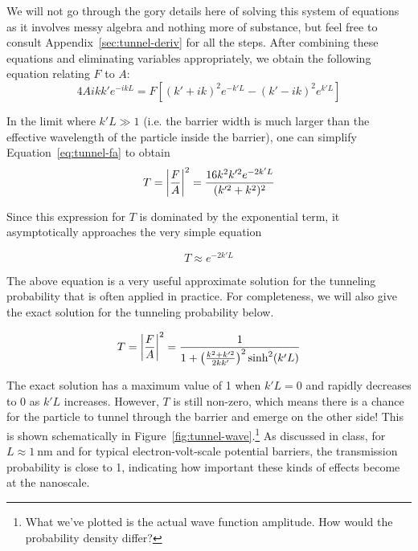We will not go through the gory details here of solving this system of equations as it involves messy algebra and nothing more of substance, but feel free to consult Appendix~\ref{sec:tunnel-deriv} for all the steps. After combining these equations and eliminating variables appropriately, we obtain the following equation relating $F$ to $A$:
\begin{equation}
	4Aikk'e^{-ikL} = F \left[(k'+ik)^2e^{-k'L} - (k'-ik)^2e^{k'L}\right] \label{eq:tunnel-fa}
\end{equation}

In the limit where $k'L \gg 1$ (i.e. the barrier width is much larger than the effective wavelength of the particle inside the barrier), one can simplify Equation~\ref{eq:tunnel-fa} to obtain
\begin{equation}
	T = \abs{\frac{F}{A}}^2 = \frac{16k^2k^{\prime 2}e^{-2k'L}}{(k^{\prime 2}+k^2)^2} \label{eq:tunnel-prob}
\end{equation}

Since this expression for $T$ is dominated by the exponential term, it asymptotically approaches the very simple equation
\begin{tcolorbox}[title = Tunneling probability approximation when $E < V_0$] \vspace{-2ex}
	\begin{equation}
		T \approx e^{-2k'L} \label{eq:tunnel-approx}
	\end{equation}
\end{tcolorbox}

The above equation is a very useful approximate solution for the tunneling probability that is often applied in practice. For completeness, we will also give the exact solution for the tunneling probability below.
\begin{tcolorbox}[title = Tunneling probability exact solution when $E < V_0$] \vspace{-2ex}
	\begin{equation}
		T = \abs{\frac{F}{A}}^2 = \frac{1}{1 + \left(\frac{k^2+k^{\prime 2}}{2kk'}\right)^2 \sinh^2(k'L)} \label{eq:tunnel-prob-full}
	\end{equation}
\end{tcolorbox}

The exact solution has a maximum value of 1 when $k'L=0$ and rapidly decreases to 0 as $k'L$ increases. However, $T$ is still non-zero, which means there is a chance for the particle to tunnel through the barrier and emerge on the other side! This is shown schematically in Figure~\ref{fig:tunnel-wave}.\footnote{What we've plotted is the actual wave function amplitude. How would the probability density differ?} As discussed in class, for $L \approx \SI{1}{\nano\meter}$ and for typical electron-volt-scale potential barriers, the transmission probability is close to 1, indicating how important these kinds of effects become at the nanoscale. \par

